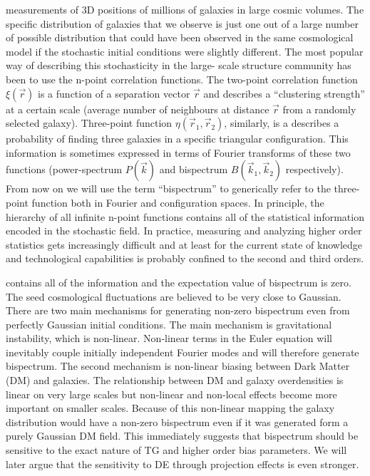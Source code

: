 measurements of 3D positions of millions of galaxies in large cosmic volumes.
The specific distribution of galaxies that we observe is just one out of a
large number of possible distribution that could have been observed in the
same cosmological model if the stochastic initial conditions were slightly
different. The most popular way of describing this stochasticity in the large-
scale structure community has been to use the n-point correlation functions.
The two-point correlation function $\xi(\vec{r})$ is a function of a
separation vector $\vec{r}$ and describes a ``clustering strength'' at a
certain scale (average number of neighbours at distance $\vec{r}$ from a
randomly selected galaxy). Three-point function $\eta(\vec{r}_1, \vec{r}_2)$,
similarly, is a describes a probability of finding three galaxies  in a
specific triangular configuration. This information is sometimes expressed in
terms of Fourier transforms of these two functions  (power-spectrum
$P(\vec{k})$ and bispectrum $B(\vec{k}_1, \vec{k}_2)$ respectively). From now
on we will use the term ``bispectrum'' to generically refer to the three-point
function both in Fourier and configuration spaces. In principle, the hierarchy
of all infinite n-point functions contains all of the statistical information
encoded in the stochastic field. In practice, measuring and analyzing higher
order statistics gets increasingly difficult and at least for the current
state of knowledge and technological capabilities is probably confined to the
second and third orders.

contains all of the information and the expectation value of bispectrum is
zero.  The seed cosmological fluctuations are believed to be very close to
Gaussian. There are two main mechanisms for generating non-zero bispectrum
even from perfectly Gaussian initial conditions. The main mechanism is
gravitational instability, which is non-linear.  Non-linear terms in the Euler
equation will inevitably couple initially independent Fourier modes and will
therefore generate bispectrum. The second mechanism is non-linear biasing
between Dark Matter (DM) and galaxies. The relationship between DM and galaxy
overdensities  is linear on very large scales but non-linear and non-local
effects become more important on smaller scales. Because of this non-linear
mapping the galaxy distribution would have a non-zero bispectrum even if it
was generated form a purely Gaussian DM field. This immediately suggests that
bispectrum should be sensitive to the exact nature of TG and higher order bias
parameters. We will later argue that the sensitivity to DE  through projection
effects is even stronger.

